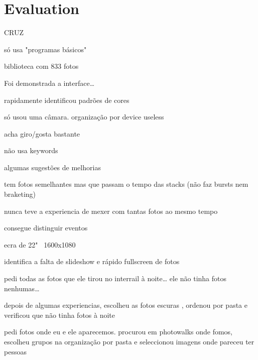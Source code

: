 \chapter{Evaluation} %
\label{chapter:evaluation}


CRUZ

\begin{myitemize}

	\item * só usa "programas básicos"

	\item biblioteca com 833 fotos

	\item Foi demonstrada a interface…

	\item * rapidamente identificou padrões de cores

	\item só usou uma câmara. organização por device useless

	\item * acha giro/gosta bastante

	\item não usa keywords

	\item * algumas sugestões de melhorias

	\item tem fotos semelhantes mas que passam o tempo das stacks (não faz bursts nem braketing)

	\item * nunca teve a experiencia de mexer com tantas fotos ao mesmo tempo

	\item * consegue distinguir eventos

	\item ecra de 22" ~1600x1080

	\item * identifica a falta de slideshow e rápido fullscreen de fotos

	\item pedi todas as fotos que ele tirou no interrail à noite… ele não tinha fotos nenhumas…

	\item depois de algumas experiencias, escolheu as fotos escuras , ordenou por pasta e verificou que não tinha fotos à noite

	\item pedi fotos onde eu e ele aparecemos. procurou em photowalks onde fomos, escolheu grupos na organização por pasta e seleccionou imagens onde pareceu ter pessoas


\end{myitemize}
